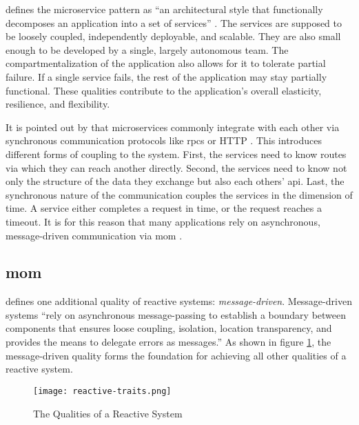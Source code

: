 \citeauthor{richardson_microservices_2019} defines the microservice pattern as \enquote{an architectural style that functionally decomposes an application into a set of services} \parencite[11]{richardson_microservices_2019}.
The services are supposed to be loosely coupled, independently deployable, and scalable.
They are also small enough to be developed by a single, largely autonomous team.
The compartmentalization of the application also allows for it to tolerate partial failure.
If a single service fails, the rest of the application may stay partially functional.
\parencite[14f.]{richardson_microservices_2019}
These qualities contribute to the application's overall elasticity, resilience, and flexibility.

It is pointed out by \citeauthor{fowler_microservices_2014} that microservices commonly integrate with each other via synchronous communication protocols like \glspl{rpc} or HTTP \parencite{fowler_microservices_2014}.
This introduces different forms of coupling to the system.
First, the services need to know routes via which they can reach another directly.
Second, the services need to know not only the structure of the data they exchange but also each others' \gls{api}.
Last, the synchronous nature of the communication couples the services in the dimension of time.
A service either completes a request in time, or the request reaches a timeout.
It is for this reason that many applications rely on asynchronous, message-driven communication via \gls{mom} \parencite{fowler_microservices_2014}.

\subsection{\acrlong{mom}}

\cite{boner_reactive_2014} defines one additional quality of reactive systems: \emph{message-driven}.
Message-driven systems \enquote{rely on asynchronous message-passing to
establish a boundary between components that ensures loose coupling, isolation,
location transparency, and provides the means to delegate errors as messages.} \parencite{boner_reactive_2014}
As shown in figure \ref{fig:reactive-traits}, the message-driven quality forms the foundation for achieving all other qualities of a reactive system.

\begin{figure}
  \centering
  \texttt{[image: reactive-traits.png]}
  \caption{The Qualities of a Reactive System \parencite{boner_reactive_2014}}
  \label{fig:reactive-traits}
\end{figure}

